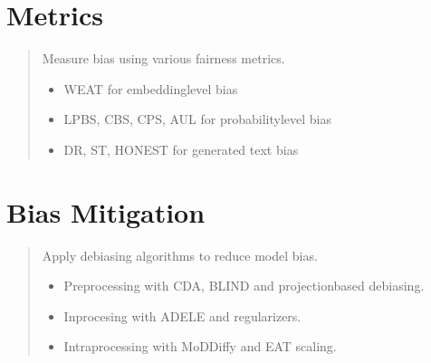 \documentclass[letterpaper,10pt,english]{sphinxmanual}
\begin{document}
\section{Metrics}
\label{\detokenize{tutorials:metrics}}
\sphinxAtStartPar
{} \sphinxhyphen{} 
\begin{quote}

\sphinxAtStartPar
Measure bias using various fairness metrics.
\begin{itemize}
\item {} 
\sphinxAtStartPar
WEAT for embedding\sphinxhyphen{}level bias

\item {} 
\sphinxAtStartPar
LPBS, CBS, CPS, AUL for probability\sphinxhyphen{}level bias

\item {} 
\sphinxAtStartPar
DR, ST, HONEST for generated text bias

\end{itemize}
\end{quote}


\section{Bias Mitigation}
\label{\detokenize{tutorials:bias-mitigation}}
\sphinxAtStartPar
{} \sphinxhyphen{} 
\begin{quote}

\sphinxAtStartPar
Apply debiasing algorithms to reduce model bias.
\begin{itemize}
\item {} 
\sphinxAtStartPar
Pre\sphinxhyphen{}processing with CDA, BLIND and projection\sphinxhyphen{}based debiasing.

\item {} 
\sphinxAtStartPar
In\sphinxhyphen{}procesing with ADELE and regularizers.

\item {} 
\sphinxAtStartPar
Intra\sphinxhyphen{}processing with MoDDiffy and EAT scaling.

\end{itemize}
\end{quote}
\end{document}
